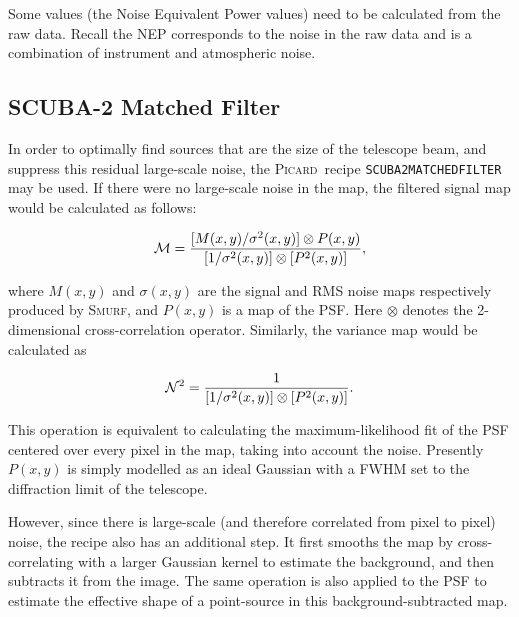 \documentclass[twoside,11pt]{article}
\newcommand{\xref}[3]{#1}
\newcommand{\xlabel}[1]{}
\renewcommand{\_}{\texttt{\symbol{95}}}
\newcommand{\picard}{\xref{\textsc{Picard}}{sun265}{}}
\newcommand{\smurf}{\xref{\textsc{Smurf}}{sun258}{}}
\newcommand{\drrecipe}[1]{\texttt{#1}}
\begin{document}
Some values (the Noise Equivalent Power values) need to be calculated
from the raw data. Recall the NEP corresponds to the noise in the raw
data and is a combination of instrument and atmospheric noise.

\newpage
\subsection{\xlabel{matchedfilter}SCUBA-2 Matched Filter}
\label{app:mf}

In order to optimally find sources that are the size of the telescope
beam, and suppress this residual large-scale noise, the \picard\
recipe \drrecipe{SCUBA2\_MATCHED\_FILTER} may be used. If there were
no large-scale noise in the map, the filtered signal map would be
calculated as follows:

\begin{equation}
  {\cal{M}} = \frac{[M(x,y)/\sigma^2(x,y)] \otimes P(x,y)}
  {[1/\sigma^2(x,y)] \otimes [P^2(x,y)]},
\end{equation}

where $M(x,y)$ and $\sigma(x,y)$ are the signal and RMS
noise maps respectively produced by \smurf, and $P(x,y)$ is a map of the
PSF. Here \(\otimes\) denotes the 2-dimensional cross-correlation
operator. Similarly, the variance map would be calculated as

\begin{equation}
  {\cal{N}}^2 = \frac{1}{[1/\sigma^2(x,y)] \otimes [P^2(x,y)]}.
\end{equation}

This operation is equivalent to calculating the maximum-likelihood fit
of the PSF centered over every pixel in the map, taking into account
the noise. Presently $P(x,y)$ is simply modelled as an ideal Gaussian
with a FWHM set to the diffraction limit of the telescope.

However, since there is large-scale (and therefore correlated from
pixel to pixel) noise, the recipe also has an additional step. It
first smooths the map by cross-correlating with a larger Gaussian
kernel to estimate the background, and then subtracts it from the
image. The same operation is also applied to the PSF to estimate the
effective shape of a point-source in this background-subtracted map.
\end{document}
